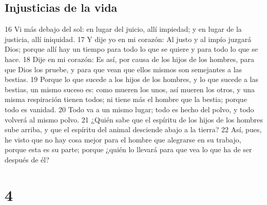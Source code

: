\section*{Injusticias de la vida}

16 Vi más debajo del sol: en lugar del juicio, allí impiedad; y en lugar de la justicia, allí iniquidad.
17 Y dije yo en mi corazón: Al justo y al impío juzgará Dios; porque allí hay un tiempo para todo lo que se quiere y para todo lo que se hace.
18 Dije en mi corazón: Es así, por causa de los hijos de los hombres, para que Dios los pruebe, y para que vean que ellos mismos son semejantes a las bestias.
19 Porque lo que sucede a los hijos de los hombres, y lo que sucede a las bestias, un mismo suceso es: como mueren los unos, así mueren los otros, y una misma respiración tienen todos; ni tiene más el hombre que la bestia; porque todo es vanidad.
20 Todo va a un mismo lugar; todo es hecho del polvo, y todo volverá al mismo polvo.
21 ¿Quién sabe que el espíritu de los hijos de los hombres sube arriba, y que el espíritu del animal desciende abajo a la tierra?
22 Así, pues, he visto que no hay cosa mejor para el hombre que alegrarse en su trabajo, porque esta es su parte; porque ¿quién lo llevará para que vea lo que ha de ser después de él?

\chapter{4}

